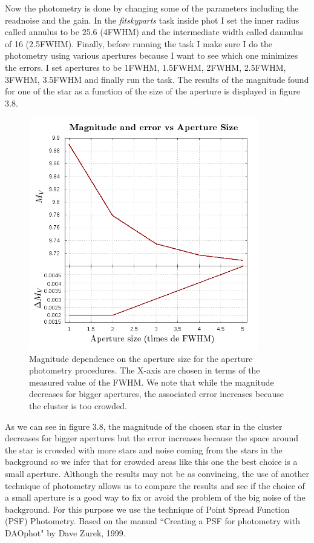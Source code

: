 Now the photometry is done by changing some of the parameters including the readnoise and the gain. In the \textit{fitskyparts} task inside phot I set the inner radius called annulus to be 25.6 (4FWHM) and the intermediate width called dannulus of 16 (2.5FWHM). Finally, before running the task I make sure I do the photometry using various apertures because I want to see which one minimizes the errors. I set apertures to be 1FWHM, 1.5FWHM, 2FWHM, 2.5FWHM, 3FWHM, 3.5FWHM and finally run the task. The results of the magnitude found for one of the star as a function of the size of the aperture is displayed in figure 3.8.

\begin{figure}[H]
\centering
\includegraphics[width=10cm]{images/aperture_size.png}
\caption[Photometry results of Magnitudes vs Size of apertures]{Magnitude dependence on the aperture size for the aperture photometry procedures. The X-axis are chosen in terms of the measured value of the FWHM. We note that while the magnitude decreases for bigger apertures, the associated error increases because the cluster is too crowded.}
\end{figure}

As we can see in figure 3.8, the magnitude of the chosen star in the cluster decreases for bigger apertures but the error increases because the space around the star is crowded with more stars and noise coming from the stars in the background so we infer that for crowded areas like this one the best choice is a small aperture. Although the results may not be as convincing, the use of another technique of photometry allows us to compare the results and see if the choice of a small aperture is a good way to fix or avoid the problem of the big noise of the background. For this purpose we use the technique of Point Spread Function (PSF) Photometry. Based on the manual ``Creating a PSF for photometry with DAOphot" by Dave Zurek, 1999.

